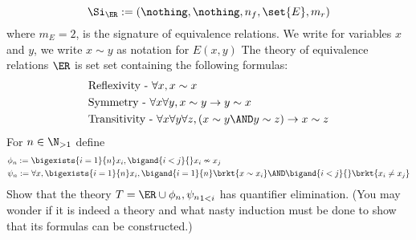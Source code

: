 \begin{eg}
    \[\Si_{\ER} := (\nothing,\nothing,n_f,\set{E},m_r)\]
    where $m_E = 2$, is the signature of equivalence relations.
    We write for variables $x$ and $y$, 
    we write $x \sim y$ as notation for $E(x,y)$
    The theory of equivalence relations $\ER$ 
    is set set containing the following formulas:
    \begin{align*}
        &\text{Reflexivity - } \forall x, x \sim x\\
        &\text{Symmetry - } \forall x \forall y, x \sim y \to y \sim x\\
        &\text{Transitivity - } 
        \forall x \forall y \forall z, (x \sim y \AND y \sim z) \to x \sim z
    \end{align*}
    For $n \in \N_{>1}$ define 
    \begin{align*}
        &\phi_n := \bigexists{i = 1}{n} x_i, \bigand{i < j}{} x_i \nsim x_j\\
        &\psi_n := \forall x, \bigexists{i = 1}{n} x_i, 
            \bigand{i = 1}{n} \brkt{x \sim x_i} \AND 
            \bigand{i < j}{} \brkt{x_i \ne x_j}
    \end{align*}
    Show that the theory $T = \ER \cup {\phi_n, \psi_n}_{1 < i}$ has 
    quantifier elimination.
    (You may wonder if it is indeed a theory
    and what nasty induction must be done to 
    show that its formulas can be constructed.)
\end{eg}
